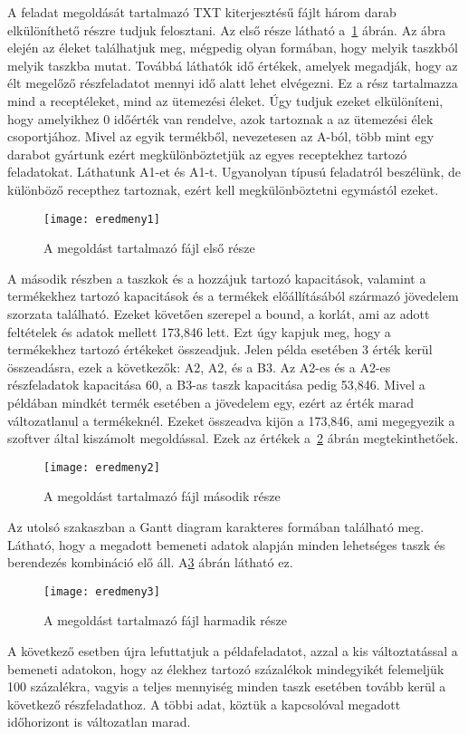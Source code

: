 A feladat megoldását tartalmazó TXT kiterjesztésű fájlt három darab elkülöníthető részre tudjuk felosztani. Az első része látható a~\ref{eredmeny1} ábrán. Az ábra elején az éleket találhatjuk meg, mégpedig olyan formában, hogy melyik taszkból melyik taszkba mutat. Továbbá láthatók idő értékek, amelyek megadják, hogy az élt megelőző részfeladatot mennyi idő alatt lehet elvégezni. Ez a rész tartalmazza mind a receptéleket, mind az ütemezési éleket. Úgy tudjuk ezeket elkülöníteni, hogy amelyikhez 0 időérték van rendelve, azok tartoznak a az ütemezési élek csoportjához. Mivel az egyik termékből, nevezetesen az A-ból, több mint egy darabot gyártunk ezért megkülönböztetjük az egyes receptekhez tartozó feladatokat. Láthatunk A1-et és A1-t. Ugyanolyan típusú feladatról beszélünk, de különböző recepthez tartoznak, ezért kell megkülönböztetni egymástól ezeket. 
\begin{figure}[H]
\begin{center}
\texttt{[image: eredmeny1]}
\caption{A megoldást tartalmazó fájl első része}
\label{eredmeny1}
\end{center}
\end{figure}
A második részben a taszkok és a hozzájuk tartozó kapacitások, valamint a termékekhez tartozó kapacitások és a termékek előállításából származó jövedelem szorzata található. Ezeket követően szerepel a bound, a korlát, ami az adott feltételek és adatok mellett 173,846 lett. Ezt úgy kapjuk meg, hogy a termékekhez tartozó értékeket összeadjuk. Jelen példa esetében 3 érték kerül összeadásra, ezek a következők: A2, A2, és a B3. Az A2-es és a A2-es részfeladatok kapacitása 60, a B3-as taszk kapacitása pedig 53,846. Mivel a példában mindkét termék esetében a jövedelem egy, ezért az érték marad változatlanul a termékeknél. Ezeket összeadva kijön a 173,846, ami megegyezik a szoftver által kiszámolt megoldással. Ezek az értékek a~\ref{eredmeny2} ábrán megtekinthetőek.
\begin{figure}[H]
\begin{center}
\texttt{[image: eredmeny2]}
\caption{A megoldást tartalmazó fájl második része}
\label{eredmeny2}
\end{center}
\end{figure}
Az utolsó szakaszban a Gantt diagram karakteres formában található meg. Látható, hogy a megadott bemeneti adatok alapján minden lehetséges taszk és berendezés kombináció elő áll. A\ref{eredmeny3} ábrán látható ez. 
\begin{figure}[H]
\begin{center}
\texttt{[image: eredmeny3]}
\caption{A megoldást tartalmazó fájl harmadik része}
\label{eredmeny3}
\end{center}
\end{figure}
A következő esetben újra lefuttatjuk a példafeladatot, azzal a kis változtatással a bemeneti adatokon, hogy az élekhez tartozó százalékok mindegyikét felemeljük 100 százalékra, vagyis a teljes mennyiség minden taszk esetében tovább kerül a következő részfeladathoz. A többi adat, köztük a kapcsolóval megadott időhorizont is változatlan marad. 

